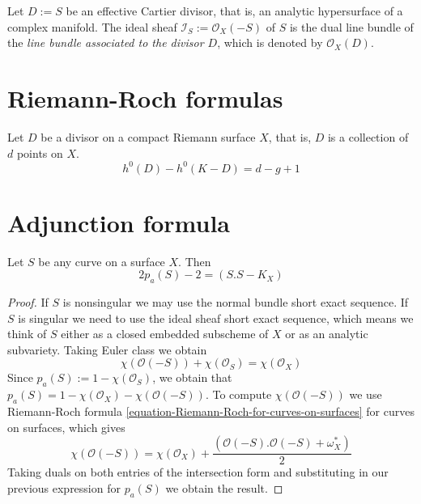 \begin{definition}
\label{definition-sheaf-associated-to-effective-Cartier-divisor}
Let $D:=S$ be an effective Cartier divisor, that is, an analytic hypersurface of
a complex manifold. The ideal sheaf $\mathcal{I}_S:=\mathcal{O}_X(-S)$ of $S$ is
the dual line bundle of the {\it line bundle associated to the divisor $D$},
which is denoted by $\mathcal{O}_X(D)$.
\end{definition}

\section{Riemann-Roch formulas}
\label{section-Riemann-Roch}

\begin{theorem}
\label{theorem-Riemann-Roch-for-Riemann-surfaces}
Let $D$ be a divisor on a compact Riemann surface $X$, that is, $D$ is a
collection of $d$ points on $X$.
\begin{equation}
\label{equation-Riemann-Roch-for-Riemann-surfaces}
h^0(D)-h^0(K-D)=d-g+1
\end{equation}
\end{theorem}

\section{Adjunction formula}
\label{section-adjunction-formula}

\begin{lemma}
\label{lemma-adjunction-formula-for-curves-on-surfaces}
Let $S$ be any curve on a surface $X$. Then
\begin{equation}
\label{equation-adjunction-formula-for-curves-on-surfaces}
2p_a(S)-2=(S.S-K_X)
\end{equation}
\end{lemma}

\begin{proof}
If $S$ is nonsingular we may use the normal bundle short exact sequence. If
$S$ is singular we need to use the ideal sheaf short exact sequence, which means
we think of $S$ either as a closed embedded subscheme of $X$ or as an analytic 
subvariety. Taking Euler class we obtain
$$
\chi(\mathcal{O}(-S))+\chi(\mathcal{O}_S)=\chi(\mathcal{O}_X)
$$
Since $p_a(S):=1-\chi(\mathcal{O}_S)$, we obtain that
$p_a(S)=1-\chi(\mathcal{O}_X)-\chi(\mathcal{O}(-S))$. To compute
$\chi(\mathcal{O}(-S))$ we use Riemann-Roch formula
\ref{equation-Riemann-Roch-for-curves-on-surfaces} for curves on surfaces, which
gives
$$
\chi(\mathcal{O}(-S))=\chi(\mathcal{O}_X)
+\frac{(\mathcal{O}(-S).\mathcal{O}(-S)+\omega_X^*)}{2}
$$
Taking duals on both entries of the intersection form and substituting in our
previous expression for $p_a(S)$ we obtain the result.
\end{proof}

